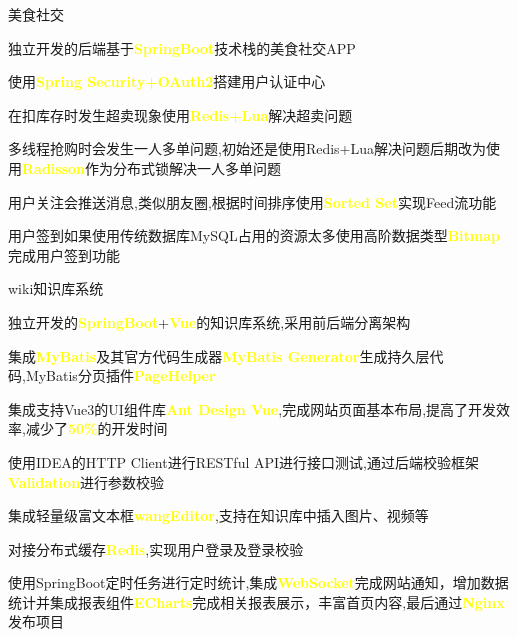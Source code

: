 \begin{cventries}
	\cventry
	{} %
	{美食社交} %
	{} %
	{} %
	{
		\begin{cvitems} %
			\item {独立开发的后端基于\textcolor{yellow}{\textbf{SpringBoot}}技术栈的美食社交APP}
			\item {使用\textcolor{yellow}{\textbf{Spring Security+OAuth2}}搭建用户认证中心}
			\item {在扣库存时发生超卖现象使用\textcolor{yellow}{\textbf{Redis+Lua}}解决超卖问题}
			\item {多线程抢购时会发生一人多单问题,初始还是使用Redis+Lua解决问题后期改为使用\textcolor{yellow}{\textbf{Radisson}}作为分布式锁解决一人多单问题}
			\item {用户关注会推送消息,类似朋友圈,根据时间排序使用\textcolor{yellow}{\textbf{Sorted Set}}实现Feed流功能}
			\item {用户签到如果使用传统数据库MySQL占用的资源太多使用高阶数据类型\textcolor{yellow}{\textbf{Bitmap}}完成用户签到功能}
		\end{cvitems}
	}
	\cventry
	{} %
	{wiki知识库系统} %
	{} %
	{} %
	{
		\begin{cvitems} %
			\item {独立开发的\textcolor{yellow}{\textbf{SpringBoot}}+\textcolor{yellow}{\textbf{Vue}}的知识库系统,采用前后端分离架构}
			\item {集成\textcolor{yellow}{\textbf{MyBatis}}及其官方代码生成器\textcolor{yellow}{\textbf{MyBatis Generator}}生成持久层代码,MyBatis分页插件\textcolor{yellow}{\textbf{PageHelper}}}
			\item {集成支持Vue3的UI组件库\textcolor{yellow}{\textbf{Ant Design Vue}},完成网站页面基本布局,提高了开发效率,减少了\textcolor{yellow}{\textbf{50\%}}的开发时间}
			\item {使用IDEA的HTTP Client进行RESTful API进行接口测试,通过后端校验框架\textcolor{yellow}{\textbf{Validation}}进行参数校验}
			\item {集成轻量级富文本框\textcolor{yellow}{\textbf{wangEditor}},支持在知识库中插入图片、视频等}
			\item {对接分布式缓存\textcolor{yellow}{\textbf{Redis}},实现用户登录及登录校验}
			\item {使用SpringBoot定时任务进行定时统计,集成\textcolor{yellow}{\textbf{WebSocket}}完成网站通知，增加数据统计并集成报表组件\textcolor{yellow}{\textbf{ECharts}}完成相关报表展示，丰富首页内容,最后通过\textcolor{yellow}{\textbf{Nginx}}发布项目}
		\end{cvitems}
	}


\end{cventries}
